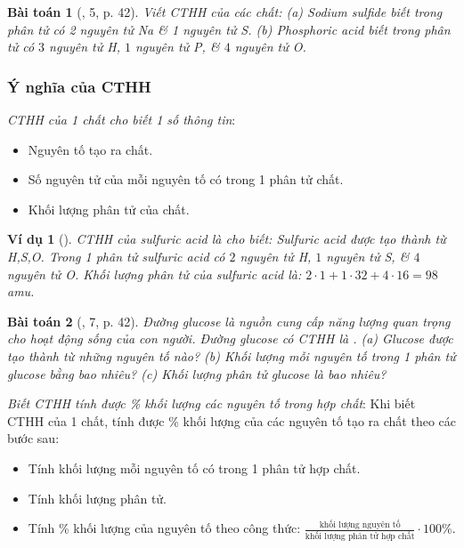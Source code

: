 \documentclass{article}
\newtheorem{baitoan}{Bài toán}
\newtheorem{vidu}{Ví dụ}
\begin{document}
\begin{baitoan}[\cite{SGK_KHTN_7_Canh_Dieu}, 5, p. 42]
	Viết CTHH của các chất: (a) Sodium sulfide biết trong phân tử có 2 nguyên tử \emph{Na} \& 1 nguyên tử \emph{S}. (b) Phosphoric acid biết trong phân tử có $3$ nguyên tử \emph{H}, $1$ nguyên tử \emph{P}, \& $4$ nguyên tử \emph{O}.
\end{baitoan}

\subsubsection{Ý nghĩa của CTHH}
 \textit{CTHH của 1 chất cho biết 1 số thông tin}:
\begin{itemize}
	\item Nguyên tố tạo ra chất.
	\item Số nguyên tử của mỗi nguyên tố có trong 1 phân tử chất.
	\item Khối lượng phân tử của chất.
\end{itemize}

\begin{vidu}[]
	CTHH của sulfuric acid là \emph{} cho biết: Sulfuric acid được tạo thành từ \emph{H,S,O}. Trong 1 phân tử sulfuric acid có $2$ nguyên tử \emph{H}, $1$ nguyên tử \emph{S}, \& $4$ nguyên tử \emph{O}. Khối lượng phân tử của sulfuric acid là: $2\cdot1 + 1\cdot32 + 4\cdot16 = 98$ amu.
\end{vidu}

\begin{baitoan}[\cite{SGK_KHTN_7_Canh_Dieu}, 7, p. 42]
	Đường glucose là nguồn cung cấp năng lượng quan trọng cho hoạt động sống của con người. Đường glucose có CTHH là \emph{}. (a) Glucose được tạo thành từ những nguyên tố nào? (b) Khối lượng mỗi nguyên tố trong 1 phân tử glucose bằng bao nhiêu? (c) Khối lượng phân tử glucose là bao nhiêu?
\end{baitoan}
\noindent{} \textit{Biết CTHH tính được \% khối lượng các nguyên tố trong hợp chất}: Khi biết CTHH của 1 chất, tính được \% khối lượng của các nguyên tố tạo ra chất theo các bước sau:
\begin{itemize}
	\item Tính khối lượng mỗi nguyên tố có trong 1 phân tử hợp chất.
	\item Tính khối lượng phân tử.
	\item Tính \% khối lượng của nguyên tố theo công thức: $\frac{\mbox{khối lượng nguyên tố}}{\mbox{khối lượng phân tử hợp chất}}\cdot100$\%.
\end{itemize}
\end{document}
